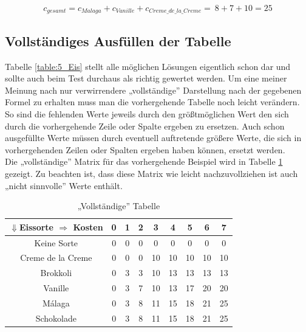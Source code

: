 \documentclass[a4paper, 12pt]{article}
\begin{document}
\begin{equation}
	\label{equation:Wert}
	c_{gesamt} = c_{Malaga} + c_{Vanille} + c_{Creme\_de\_la\_Creme} = \
	8 + 7 + 10 = 25
\end{equation}

\subsection{Vollständiges Ausfüllen der Tabelle}

Tabelle \ref{table:5_Eis} stellt alle möglichen Lösungen eigentlich schon dar und sollte auch beim Test durchaus als richtig gewertet werden. Um eine meiner Meinung nach nur verwirrendere „vollständige” Darstellung nach der gegebenen Formel zu erhalten muss man die vorhergehende Tabelle noch leicht verändern.\\ 

So sind die fehlenden Werte jeweils durch den größtmöglichen Wert den sich durch die vorhergehende Zeile oder Spalte ergeben zu ersetzen. Auch schon ausgefüllte Werte müssen durch eventuell auftretende größere Werte, die sich in vorhergehenden Zeilen oder Spalten ergeben haben können, ersetzt werden.\\

Die „vollständige” Matrix für das vorhergehende Beispiel wird in Tabelle \ref{table:Vollstaendig} gezeigt. Zu beachten ist, dass diese Matrix wie leicht nachzuvollziehen ist auch „nicht sinnvolle” Werte enthält.

\begin{table}[H]
	\begin{center}
		\begin{tabular}{c|cccccccc}
			$\Downarrow$Eissorte $\Rightarrow$ Kosten & 0 & 1 & 2 & 3 & 4 & 5 &
			6 & 7\\
			\hline
			Keine Sorte			& 0 & 0 & 0 & 0	 &	0 &	 0 & 0 & 0	 \\
			Creme de la Creme	& 0 & 0 & 0 & 10 & 10 & 10 & 10 & 10 \\
			Brokkoli			& 0 & 3 & 3 & 10 & 13 & 13 & 13 & 13 \\
			Vanille				& 0 & 3 & 7 & 10 & 13 & 17 & 20 & 20 \\
			Málaga				& 0 & 3 & 8 & 11 & 15 & 18 & 21 & 25 \\
			Schokolade			& 0 & 3 & 8 & 11 & 15 & 18 & 21 & 25 \\
		\end{tabular}
	\end{center}
\caption{„Vollständige” Tabelle}
\label{table:Vollstaendig}
\end{table}


\titleformat{\section}{\sffamily\bfseries}{}{0pt}{}[{\color{aqua}\hrule}]

\printbibliography
\end{document}
